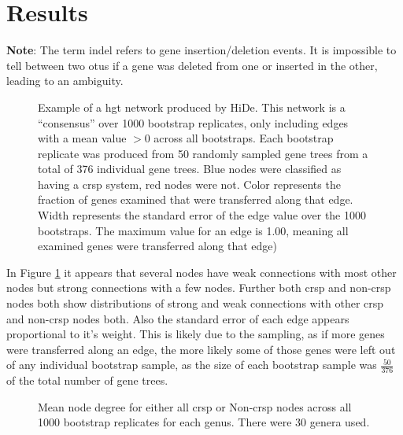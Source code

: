 \section{Results}
\textbf{Note}: The term indel refers to gene insertion/deletion events.
It is impossible to tell between two \ac{otu}s if a gene was deleted from one or inserted in the other, leading to an ambiguity.
\FloatBarrier
\begin{figure}[htb!]
    \caption{Example of a \ac{hgt} network produced by HiDe.
             This network is a ``consensus'' over 1000 bootstrap replicates, only including edges with a mean value $> 0$ across all bootstraps.
             Each bootstrap replicate was produced from 50 randomly sampled gene trees from a total of 376 individual gene trees.
             Blue nodes were classified as having a \ac{crsp} system, red nodes were not.
             Color represents the fraction of genes examined that were transferred along that edge.
            Width represents the standard error of the edge value over the 1000 bootstraps.
            The maximum value for an edge is 1.00, meaning all examined genes were transferred along that edge)}
    \label{net}
\end{figure}
\FloatBarrier
In Figure \ref{net} it appears that several nodes have weak connections with most other nodes but strong connections with a few nodes.
Further both \ac{crsp} and non-\ac{crsp} nodes both show distributions of strong and weak connections with other \ac{crsp} and non-\ac{crsp} nodes both.
Also the standard error of each edge appears proportional to it's weight.
This is likely due to the sampling, as if more genes were transferred along an edge, the more likely some of those genes were left out of any individual bootstrap sample, as the size of each bootstrap sample was $\frac{50}{376}$ of the total number of gene trees.

\FloatBarrier
\begin{figure}[htb!]
    \caption{Mean node degree for either all \ac{crsp} or Non-\ac{crsp} nodes across all 1000 bootstrap replicates for each genus. There were 30 genera used.}
    \label{db}
\end{figure}
\FloatBarrier

